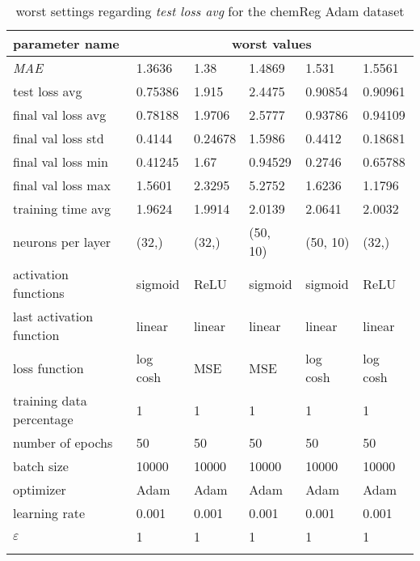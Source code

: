 \begin{longtable}{|l|l|l|l|l|>{\columncolor{worstColumnColor}}l|}
\hline
\textbf{parameter name} & \multicolumn{5}{c|}{\textbf{worst values}} \\
\hline
\textit{MAE}             &  1.3636 &    1.38 &  1.4869 &   1.531 &  1.5561 \\
test loss avg            & 0.75386 & 1.915   & 2.4475  & 0.90854 & 0.90961 \\
final val loss avg       & 0.78188 & 1.9706  & 2.5777  & 0.93786 & 0.94109 \\
final val loss std       & 0.4144  & 0.24678 & 1.5986  & 0.4412  & 0.18681 \\
final val loss min       & 0.41245 & 1.67    & 0.94529 & 0.2746  & 0.65788 \\
final val loss max       & 1.5601  & 2.3295  & 5.2752  & 1.6236  & 1.1796  \\
training time avg        & 1.9624  & 1.9914  & 2.0139  & 2.0641  & 2.0032  \\
neurons per layer        & (32,)   & (32,)   & (50, 10) & (50, 10) & (32,)   \\
activation functions     & sigmoid & ReLU    & sigmoid & sigmoid & ReLU    \\
{\color{equalParamColor} last activation function } & {\color{equalParamColor} linear } & {\color{equalParamColor} linear } & {\color{equalParamColor} linear } & {\color{equalParamColor} linear } & {\color{equalParamColor} linear } \\
loss function            & log cosh & MSE     & MSE     & log cosh & log cosh \\
{\color{equalParamColor} training data percentage } & {\color{equalParamColor} 1 } & {\color{equalParamColor} 1 } & {\color{equalParamColor} 1 } & {\color{equalParamColor} 1 } & {\color{equalParamColor} 1 } \\
{\color{equalParamColor} number of epochs } & {\color{equalParamColor} 50 } & {\color{equalParamColor} 50 } & {\color{equalParamColor} 50 } & {\color{equalParamColor} 50 } & {\color{equalParamColor} 50 } \\
{\color{equalParamColor} batch size } & {\color{equalParamColor} 10000 } & {\color{equalParamColor} 10000 } & {\color{equalParamColor} 10000 } & {\color{equalParamColor} 10000 } & {\color{equalParamColor} 10000 } \\
{\color{equalParamColor} optimizer } & {\color{equalParamColor} Adam } & {\color{equalParamColor} Adam } & {\color{equalParamColor} Adam } & {\color{equalParamColor} Adam } & {\color{equalParamColor} Adam } \\
{\color{equalParamColor} learning rate } & {\color{equalParamColor} 0.001 } & {\color{equalParamColor} 0.001 } & {\color{equalParamColor} 0.001 } & {\color{equalParamColor} 0.001 } & {\color{equalParamColor} 0.001 } \\
{\color{equalParamColor} $\varepsilon$ } & {\color{equalParamColor} 1 } & {\color{equalParamColor} 1 } & {\color{equalParamColor} 1 } & {\color{equalParamColor} 1 } & {\color{equalParamColor} 1 } \\
\hline

\caption{worst settings regarding \textit{test loss avg} for the chemReg Adam dataset}
\label{table:test_loss_avg_worst_chemreg_adam}
\end{longtable}
